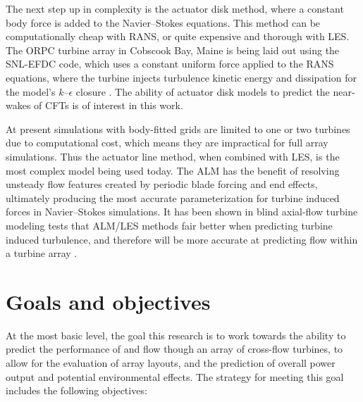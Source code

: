 
The next step up in complexity is the actuator disk method, where a constant
body force is added to the Navier--Stokes equations. This method can be
computationally cheap with RANS, or quite expensive and thorough with LES. The
ORPC turbine array in Cobscook Bay, Maine is being laid out using the SNL-EFDC
code, which uses a constant uniform force applied to the RANS equations, where
the turbine injects turbulence kinetic energy and dissipation for the model's
$k$--$\epsilon$ closure \cite{Nelson2013}. The ability of actuator disk models
to predict the near-wakes of CFTs is of interest in this work.

At present simulations with body-fitted grids are limited to one or two turbines
due to computational cost, which means they are impractical for full array
simulations. Thus the actuator line method, when combined with LES, is the most
complex model being used today. The ALM has the benefit of resolving unsteady
flow features created by periodic blade forcing and end effects, ultimately
producing the most accurate parameterization for turbine induced forces in
Navier--Stokes simulations. It has been shown in blind axial-flow turbine
modeling tests that ALM/LES methods fair better when predicting turbine induced
turbulence, and therefore will be more accurate at predicting flow within a
turbine array \cite{Krogstad2013}.


\section{Goals and objectives}

At the most basic level, the goal this research is to work towards the ability
to predict the performance of and flow though an array of cross-flow turbines,
to allow for the evaluation of array layouts, and the prediction of overall
power output and potential environmental effects. The strategy for meeting this
goal includes the following objectives:

